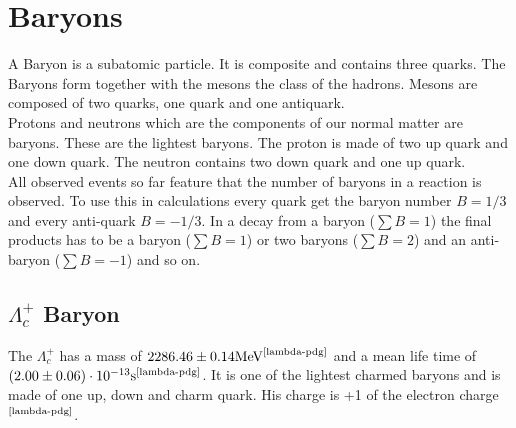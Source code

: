 \section{Baryons}
A Baryon is a subatomic particle. It is composite and contains three quarks.
The Baryons form together with the mesons the class of the hadrons. Mesons are 
composed of two quarks, one quark and one antiquark.\\
Protons and neutrons which are the components of our normal matter are baryons. 
These are the lightest baryons. The proton is made of two up quark and one down 
quark. The neutron contains two down quark and one up quark.\\
All observed events so far feature that the number of baryons in a reaction is 
observed. To use this in calculations every quark get the baryon number \(B = 1/3\) and 
every anti-quark \(B = -1/3\). In a decay from a baryon (\(\sum B = 1\)) the final 
products has to be a baryon (\(\sum B = 1\)) or two baryons (\(\sum B = 2\)) 
and an anti-baryon (\(\sum B = -1\)) and so on. 

\subsection{\(\Lambda_c^+\) Baryon}
The \(\Lambda_c^+\) has a mass of \(2286.46 \pm 0.14 \text{MeV}^
{\text{\cite{lambda-pdg}}}\) and a mean life time of \(\left( 2.00 \pm 0.06\right)
\cdot 10^{-13} \text{s}^{\text{\cite{lambda-pdg}}}\). It is one of the lightest charmed 
baryons and is made of one up, down and charm quark. His charge is +1 of the 
electron charge\(^{\text{\cite{lambda-pdg}}}\).

